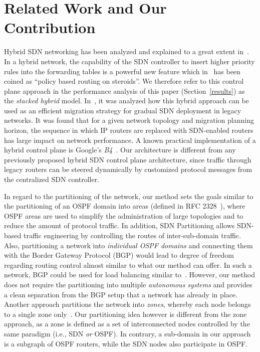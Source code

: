 \documentclass[journal]{IEEEtran}
\begin{document}
\section{Related Work and Our Contribution}\label{relatedwork}

\par Hybrid SDN networking has been analyzed and explained to a great extent in~\cite{hybrid_1, hybrid_2, hybrid_3, hybrid_4, tamal_ICC}. In a hybrid network, the capability of the SDN controller to insert higher priority rules into the forwarding tables is a powerful new feature which in~\cite{steroids} has  been coined as ``policy based routing on steroids''. We therefore refer to this control plane approach in the performance analysis of this paper (Section~\ref{results}) as the \emph{stacked hybrid} model. In~\cite{hybrid_2}, it was analyzed how this hybrid approach can be used as an efficient migration strategy for gradual SDN deployment in legacy networks. It was found that for a given network topology and migration planning horizon, the sequence in which IP routers are replaced with SDN-enabled routers has large impact on network performance. A known practical implementation of a hybrid control plane is Google's \emph{B4}~\cite{B4}. Our architecture is different from any previously proposed hybrid SDN control plane architecture, since traffic through legacy routers can be steered dynamically by customized protocol messages from the centralized SDN controller.

\par In regard to the partitioning of the network, our method sets the goals similar to the partitioning of an OSPF domain into areas (defined in RFC 2328~\cite{ospf}), where OSPF areas are used to simplify the administration of large topologies and to reduce the amount of protocol traffic. In addition, SDN Partitioning allows SDN-based traffic engineering by controlling the routes of inter-sub-domain traffic. Also, partitioning a network into \emph{individual OSPF domains} and connecting them with the Border Gateway Protocol (BGP) would lead to degree of freedom regarding routing control almost similar to what our method can offer. In such a network, BGP could be used for load balancing similar to~\cite{bgp}. However, our method does not require the partitioning into multiple \emph{autonomous systems} and provides a clean separation from the BGP setup that a network has already in place. Another approach partitions the network into \emph{zones}, whereby each node belongs to a single zone only~\cite{vissicchio}. Our partitioning idea however is different from the zone approach, as a zone is defined as a set of interconnected nodes controlled by the same paradigm (i.e., SDN \emph{or} OSPF). In contrary, a sub-domain in our approach is a subgraph of OSPF routers, while the SDN nodes also participate in OSPF.
\end{document}
